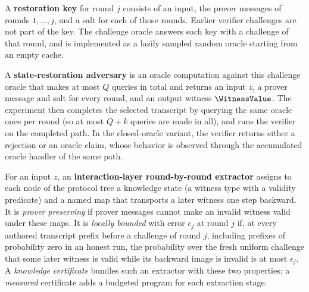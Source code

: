 \begin{definition}
    \label{def:sr_experiment}
    A \textbf{restoration key} for round \(j\) consists of an input, the prover messages of rounds
    \(1, \ldots, j\), and a salt for each of those rounds. Earlier verifier challenges are not part
    of the key. The challenge oracle answers each key with a challenge of that round, and is
    implemented as a lazily sampled random oracle starting from an empty cache.

    A \textbf{state-restoration adversary} is an oracle computation against this challenge oracle
    that makes at most \(Q\) queries in total and returns an input \(z\), a prover message and salt
    for every round, and an output witness \(\WitnessValue\). The experiment then completes the selected
    transcript by querying the same oracle once per round (so at most \(Q + k\) queries are made in
    all), and runs the verifier on the completed path. In the closed-oracle variant, the
    verifier returns either a rejection or an oracle claim, whose behavior is observed through the
    accumulated oracle handler of the same path.
    \leanok
\end{definition}

\begin{definition}
    \label{def:interaction_knowledge_certificate}
    For an input \(z\), an \textbf{interaction-layer round-by-round extractor} assigns to each node of the
    protocol tree a knowledge state (a witness type with a validity predicate) and a named map
    that transports a later witness one step backward. It is \emph{prover preserving} if prover
    messages cannot make an invalid witness valid under these maps. It is \emph{locally bounded}
    with error \(\epsilon_j\) at round \(j\) if, at every authored transcript prefix before a
    challenge of round \(j\), including prefixes of probability zero in an honest run, the
    probability over the fresh uniform challenge that some later witness is valid while its
    backward image is invalid is at most \(\epsilon_j\). A \emph{knowledge certificate} bundles
    such an extractor with these two properties; a \emph{measured} certificate adds a budgeted
    program for each extraction stage.
    \leanok
\end{definition}

